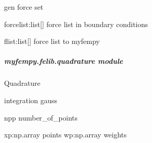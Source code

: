 \documentclass[letterpaper,10pt,english]{sphinxmanual}
\begin{document}

\begin{fulllineitems}
\label{\detokenize{myfempy.felib:myfempy.felib.physicset.gen_force}}
\pysigstartsignatures
{}
\pysigstopsignatures
\sphinxAtStartPar
gen force set
\begin{description}
\sphinxAtStartPar
forcelist:list{[}{]} \textendash{} force list in boundary conditions

\sphinxAtStartPar
flist:list{[}{]}     \textendash{} force list to myfempy

\end{description}

\end{fulllineitems}



\subparagraph{myfempy.felib.quadrature module}
\label{\detokenize{myfempy.felib:module-myfempy.felib.quadrature}}\label{\detokenize{myfempy.felib:myfempy-felib-quadrature-module}}
\sphinxAtStartPar
Quadrature

\begin{fulllineitems}
\label{\detokenize{myfempy.felib:myfempy.felib.quadrature.gaussian}}
\pysigstartsignatures
{}
\pysigstopsignatures
\sphinxAtStartPar
integration gauss
\begin{description}
\sphinxAtStartPar
npp \textendash{} number\_of\_points

\sphinxAtStartPar
xp:np.array  \textendash{} points
wp:np.array  \textendash{} weights

\end{description}

\end{fulllineitems}
\end{document}
